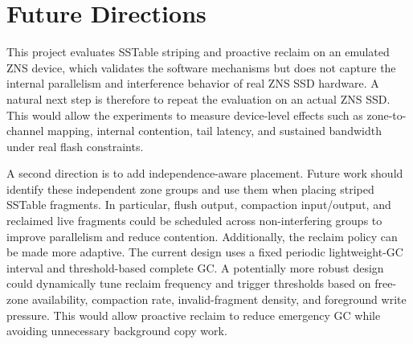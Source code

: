 \documentclass[letterpaper,twocolumn,10pt]{article}
\begin{document}
\section{Future Directions}
This project evaluates SSTable striping and proactive reclaim on an emulated ZNS device, which validates the software mechanisms but does not capture the internal parallelism and interference behavior of real ZNS SSD hardware. A natural next step is therefore to repeat the evaluation on an actual ZNS SSD. This would allow the experiments to measure device-level effects such as zone-to-channel mapping, internal contention, tail latency, and sustained bandwidth under real flash constraints. 

A second direction is to add independence-aware placement. Future work should identify these independent zone groups and use them when placing striped SSTable fragments. In particular, flush output, compaction input/output, and reclaimed live fragments could be scheduled across non-interfering groups to improve parallelism and reduce contention. Additionally, the reclaim policy can be made more adaptive. The current design uses a fixed periodic lightweight-GC interval and threshold-based complete GC. A potentially more robust design could dynamically tune reclaim frequency and trigger thresholds based on free-zone availability, compaction rate, invalid-fragment density, and foreground write pressure. This would allow proactive reclaim to reduce emergency GC while avoiding unnecessary background copy work.




\end{document}

